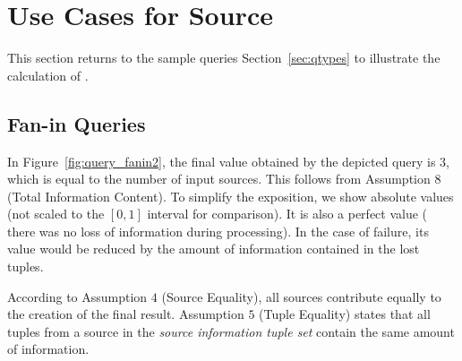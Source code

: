 \section{Use Cases for Source \DIFdelbegin {}\DIFdelend \DIFaddbegin {}\DIFaddend }
\label{sec:apps}

This section returns to the sample queries \DIFdelbegin {}\DIFdelend \DIFaddbegin {}\DIFaddend Section~\ref{sec:qtypes} to illustrate the
calculation of \sic\DIFdelbegin {}\DIFdelend .
\vspace{-10pt}
\subsection*{Fan-in Queries}

In Figure~\ref{fig:query_fanin2}, the final \sic value obtained by the depicted query is $3$, which is
equal to the number of input sources.
This follows from Assumption $8$ (Total Information Content). To simplify the exposition, we show
absolute values (\ie not scaled to the $[0,1]$ interval for comparison). It is also a perfect value (\ie
there was no loss of information during processing). In the case of failure, its value
would be reduced by the amount of information contained in the lost tuples.
\DIFdelbegin %
{%
}
\DIFdelend 

According to Assumption $4$ (Source Equality), all sources contribute equally to the creation of the
final result.
Assumption $5$ (Tuple Equality) states that all tuples from a source in the \textit{source
information tuple set} contain the same amount of information. 

